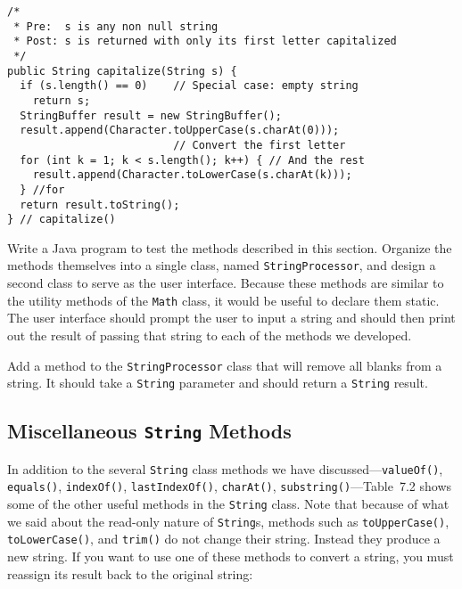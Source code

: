\begin{jjjlisting}[27pc]
\begin{lstlisting}
/*
 * Pre:  s is any non null string
 * Post: s is returned with only its first letter capitalized
 */
public String capitalize(String s) {
  if (s.length() == 0)    // Special case: empty string
    return s;
  StringBuffer result = new StringBuffer();
  result.append(Character.toUpperCase(s.charAt(0))); 
                          // Convert the first letter
  for (int k = 1; k < s.length(); k++) { // And the rest 
    result.append(Character.toLowerCase(s.charAt(k)));
  } //for
  return result.toString();
} // capitalize()
\end{lstlisting}
\end{jjjlisting}

\label{self-study-exercises}
\begin{SSTUDY}

\item Write a Java program to test the methods described in this
section.  Organize the methods themselves into a single class, named
{\tt StringProcessor}, and design a second class to serve as the user
interface. Because these methods are similar to the utility methods of
the {\tt Math} class, it would be useful to declare them static.  The
user interface should prompt the user to input a string and should
then print out the result of passing that string to each of the
methods we developed.

\item Add a method to the {\tt StringProcessor} class that will remove
all blanks from a string.  It should take a {\tt String} parameter and
should return a {\tt String} result.

\end{SSTUDY}


\subsection{Miscellaneous {\tt String} Methods}
\noindent In addition to the several {\tt String} class methods we have
discussed---{\tt valueOf()}, {\tt equals()}, {\tt indexOf()},
{\tt lastIndexOf()}, {\tt charAt()}, {\tt substring()}---Table~7.2 
shows some of the other useful methods
in the {\tt String} class.  Note that because of what we said about
the read-only nature of {\tt String}s, methods such as {\tt toUpperCase()},
{\tt toLowerCase()}, and {\tt trim()} do not  change their string.  Instead
they produce a new string.  If you want to use one of these methods to convert
a string, you must reassign its result back to the original string:

